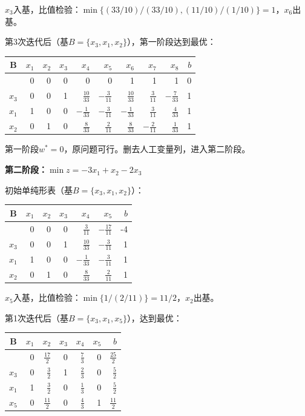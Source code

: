 \documentclass[12pt,a4paper]{article}
\begin{document}
$x_3$入基，比值检验：$\min\{(33/10)/(33/10), (11/10)/(1/10)\} = 1$，$x_6$出基。

第3次迭代后（基$B = \{x_3, x_1, x_2\}$），第一阶段达到最优：

\begin{center}
\begin{tabular}{|c|rrrrrrrr|r|}
\hline
B & $x_1$ & $x_2$ & $x_3$ & $x_4$ & $x_5$ & $x_6$ & $x_7$ & $x_8$ & $b$ \\
\hline
 & 0 & 0 & 0 & 0 & 0 & 1 & 1 & 1 & 0 \\
\hline
$x_3$ & 0 & 0 & 1 & $\frac{10}{33}$ & $-\frac{3}{11}$ & $\frac{10}{33}$ & $\frac{3}{11}$ & $-\frac{7}{33}$ & 1 \\
$x_1$ & 1 & 0 & 0 & $-\frac{1}{33}$ & $-\frac{3}{11}$ & $-\frac{1}{33}$ & $\frac{3}{11}$ & $\frac{4}{33}$ & 1 \\
$x_2$ & 0 & 1 & 0 & $\frac{8}{33}$ & $\frac{2}{11}$ & $\frac{8}{33}$ & $-\frac{2}{11}$ & $\frac{1}{33}$ & 1 \\
\hline
\end{tabular}
\end{center}

第一阶段$w^* = 0$，原问题可行。删去人工变量列，进入第二阶段。

\textbf{第二阶段：}$\min z = -3x_1 + x_2 - 2x_3$

初始单纯形表（基$B = \{x_3, x_1, x_2\}$）：

\begin{center}
\begin{tabular}{|c|rrrrr|r|}
\hline
B & $x_1$ & $x_2$ & $x_3$ & $x_4$ & $x_5$ & $b$ \\
\hline
 & 0 & 0 & 0 & $\frac{3}{11}$ & $-\frac{17}{11}$ & -4 \\
\hline
$x_3$ & 0 & 0 & 1 & $\frac{10}{33}$ & $-\frac{3}{11}$ & 1 \\
$x_1$ & 1 & 0 & 0 & $-\frac{1}{33}$ & $-\frac{3}{11}$ & 1 \\
$x_2$ & 0 & 1 & 0 & $\frac{8}{33}$ & $\frac{2}{11}$ & 1 \\
\hline
\end{tabular}
\end{center}

$x_5$入基，比值检验：$\min\{1/(2/11)\} = 11/2$，$x_2$出基。

第1次迭代后（基$B = \{x_3, x_1, x_5\}$），达到最优：

\begin{center}
\begin{tabular}{|c|rrrrr|r|}
\hline
B & $x_1$ & $x_2$ & $x_3$ & $x_4$ & $x_5$ & $b$ \\
\hline
 & 0 & $\frac{17}{2}$ & 0 & $\frac{7}{3}$ & 0 & $\frac{25}{2}$ \\
\hline
$x_3$ & 0 & $\frac{3}{2}$ & 1 & $\frac{2}{3}$ & 0 & $\frac{5}{2}$ \\
$x_1$ & 1 & $\frac{3}{2}$ & 0 & $\frac{1}{3}$ & 0 & $\frac{5}{2}$ \\
$x_5$ & 0 & $\frac{11}{2}$ & 0 & $\frac{4}{3}$ & 1 & $\frac{11}{2}$ \\
\hline
\end{tabular}
\end{center}
\end{document}
